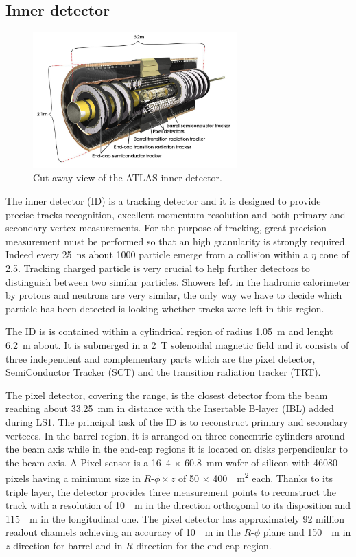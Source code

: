 \subsection{Inner detector}
\label{sec:ID}
\begin{figure}[t]
\centering
\includegraphics[width=0.7\textwidth]{LHC_ATLAS/ID}
\caption{Cut-away view of the ATLAS inner detector.}
\end{figure}

The inner detector (ID) is a tracking detector and it is designed to provide precise tracks recognition, excellent momentum resolution and both primary and secondary vertex measurements. For the purpose of tracking, great precision measurement must be performed so that an high granularity is strongly required. Indeed every \SI{25}{ns} about \num{1000} particle emerge from a collision within a $\eta$ cone of \num{2.5}. Tracking charged particle is very crucial to help further detectors to distinguish between two similar particles. Showers left in the hadronic calorimeter by protons and neutrons are very similar, the only way we have to decide which particle has been detected is looking whether tracks were left in this region.

The ID is is contained within a cylindrical region of radius \SI{1.05}{m} and lenght \SI{6.2}{m} about. It is submerged in a \SI{2}{T} solenoidal magnetic field and it consists of three independent and complementary parts which are the pixel detector, SemiConductor Tracker (SCT) and the transition radiation tracker (TRT).

The pixel detector, covering the  range, is the closest detector from the beam reaching about \SI{33.25}{mm} in distance with the Insertable B-layer (IBL) added during LS1. The principal task of the ID is to reconstruct primary and secondary verteces. In the barrel region, it is arranged on three concentric cylinders around the beam axis while in the end-cap regions it is located on disks perpendicular to the beam axis. A Pixel sensor is a \si{16.4} $\times$ \SI{60.8}{mm} wafer of silicon with \num{46080} pixels having a minimum size in $R$-$\phi \times z$ of  \si{50} $\times$ \SI{400}{\mu m^2} each. Thanks to its triple layer, the detector provides three measurement points to reconstruct the track with a resolution of \SI{10}{\mu m} in the direction orthogonal to its disposition and \SI{115}{\mu m} in the longitudinal one. The pixel detector has approximately \num{92} million readout channels achieving an accuracy of \SI{10}{\mu m} in the $R$-$\phi$ plane and \SI{150}{\mu m} in $z$ direction for barrel and in $R$ direction for the end-cap region.

